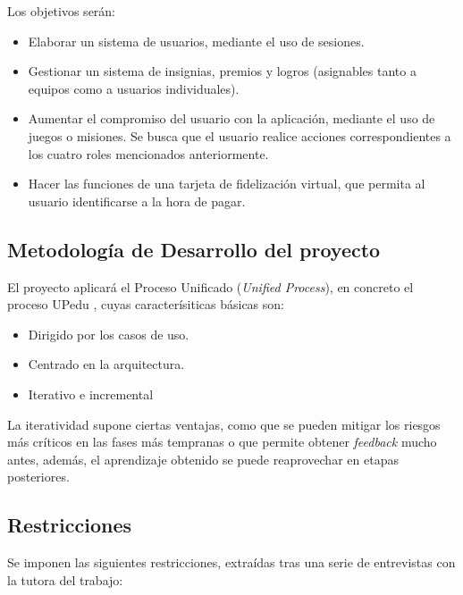 \documentclass[twoside]{report}
\begin{document}
Los objetivos serán:
\begin{itemize}
	\item Elaborar un sistema de usuarios, mediante el uso de sesiones.
	\item Gestionar un sistema de insignias, premios y logros (asignables tanto a equipos como a usuarios individuales). 
	\item Aumentar el compromiso del usuario con la aplicación, mediante el uso de juegos o misiones. Se busca que el usuario realice acciones correspondientes a los cuatro roles mencionados anteriormente.
	\item Hacer las funciones de una tarjeta de fidelización virtual, que permita al usuario identificarse a la hora de pagar.
\end{itemize}

\subsection{Metodología de Desarrollo del proyecto}
El proyecto aplicará el Proceso Unificado (\textit{Unified Process}), en concreto el proceso UPedu \cite{upedu}, cuyas caracterísiticas básicas \cite{pgpup} son: 
\begin{itemize}
\item Dirigido por los casos de uso.
\item Centrado en la arquitectura.
\item Iterativo e incremental
\end{itemize}
La iteratividad supone ciertas ventajas, como que se pueden mitigar los riesgos más críticos en las fases más tempranas o que permite obtener \textit{feedback} mucho antes, además, el aprendizaje obtenido se puede reaprovechar en etapas posteriores.

\subsection{Restricciones}
Se imponen las siguientes restricciones, extraídas tras una serie de entrevistas con la tutora del trabajo:
\end{document}
